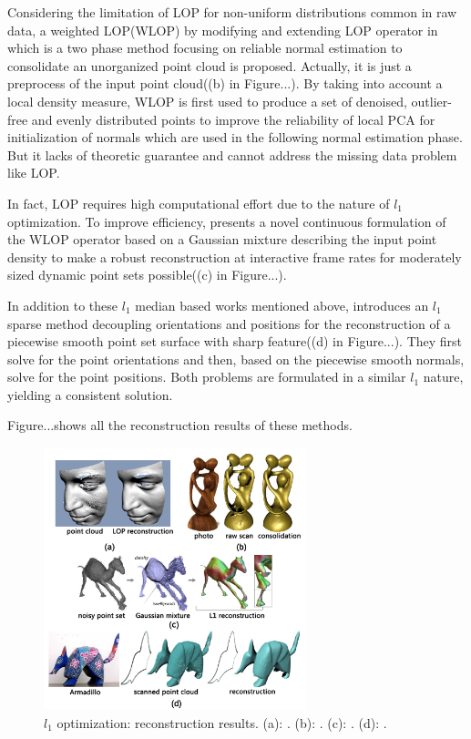 Considering the limitation of LOP for non-uniform distributions common in raw data, a weighted LOP(WLOP) by modifying and extending LOP operator in \cite{huang2009consolidation} which is a two phase method focusing on reliable normal estimation to consolidate an unorganized point cloud is proposed. Actually, it is just a preprocess of the input point cloud((b) in Figure...). By taking into account a local density measure, WLOP is first used to produce a set of denoised, outlier-free and evenly distributed points to improve the reliability of local PCA for initialization of normals which are used in the following normal estimation phase. But it lacks of theoretic guarantee and cannot address the missing data problem like LOP.

In fact, LOP requires high computational effort due to the nature of $l_1$ optimization. To improve efficiency, \cite{preiner2014CPF} presents a novel continuous formulation of the WLOP operator based on a Gaussian mixture describing the input point density to make a robust reconstruction at interactive frame rates for moderately sized dynamic point sets possible((c) in Figure...).

In addition to these $l_1$ median based works mentioned above, \cite{avron2010L1} introduces an $l_1$ sparse method decoupling orientations and positions for the reconstruction of a piecewise smooth point set surface with sharp feature((d) in Figure...). They first solve for the point orientations and then, based on the piecewise smooth normals, solve for the point positions. Both problems are formulated in a similar $l_1$ nature, yielding a consistent solution.

Figure...shows all the reconstruction results of these methods.

\begin{figure}[ht]
  \centering
  \includegraphics[width=3in]{images/reconstruction_L1}
  \caption{$l_1$ optimization: reconstruction results. (a): \cite{lipman2007parameterization}. (b): \cite{huang2009consolidation}. (c): \cite{preiner2014CPF}. (d): \cite{avron2010L1}.}
\end{figure}

